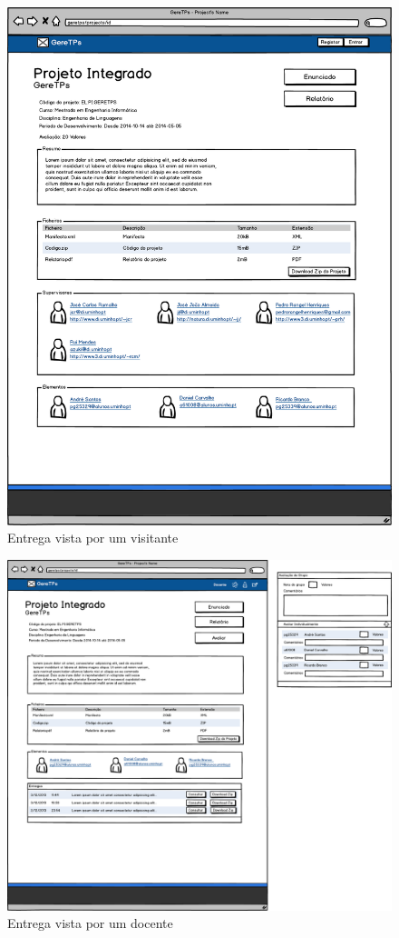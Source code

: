 \begin{figure}[htbp] 
        \centering
        \includegraphics[width=1\textwidth]{images/prototipos/mockups/projetovisitante.png}
         \caption{Entrega vista por um visitante}
         \label{fig: projetoaluno}
\end{figure}


\begin{figure}[htbp] 
        \centering
        \includegraphics[width=1\textwidth]{images/prototipos/mockups/projetodocente.png}
         \caption{Entrega vista por um docente}
         \label{fig: projetodocente}
\end{figure}












